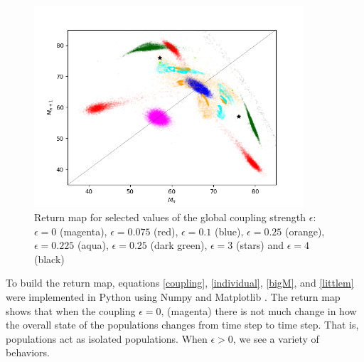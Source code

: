 \documentclass[conference]{IEEEtran}
\begin{document}
 \begin{figure}[t]
 \centering
    \includegraphics[width=100mm]{prettypicture}
    
    \caption{ Return map for selected values of  the global coupling strength $\epsilon$:  $\epsilon =0$ (magenta), $\epsilon = 0.075$ (red), $\epsilon = 0.1$ (blue), $\epsilon = 0.25$ (orange), $\epsilon = 0.225$ (aqua), $\epsilon = 0.25$ (dark green), $\epsilon = 3 $ (stars) and $\epsilon = 4$ (black)}
 \label{prettypicture}
\end{figure} 

To build the return map, equations \ref{coupling},  \ref{individual}, \ref{bigM},  and \ref{littlem} were implemented  in Python using Numpy \cite{numpy} and Matplotlib \cite{matplotlib}.   The return map shows that when the coupling $\epsilon = 0$,  (magenta) there is not much change in how the overall state of the populations changes from time step to time step.  That is, populations  act as isolated populations.   When $\epsilon > 0$, we see a variety of behaviors. 
\end{document}
